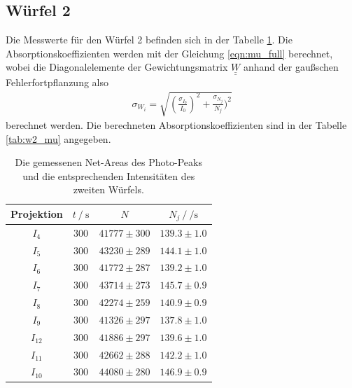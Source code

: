 \subsection{Würfel 2}
Die Messwerte für den Würfel 2 befinden sich in der Tabelle \ref{tab:w2}. Die Absorptionskoeffizienten werden mit der Gleichung \ref{eqn:mu_full} berechnet, wobei die Diagonalelemente der Gewichtungsmatrix $\underline{\underline{W}}$ 
anhand der gaußschen Fehlerfortpflanzung also 
\begin{align}
  \sigma_{W_i} = \sqrt{(\frac{\sigma_{I_0}}{I_0})^2 + \frac{\sigma_{N_j}}{N_j})^2}
\end{align}
berechnet werden. Die berechneten Absorptionskoeffizienten sind in der Tabelle \ref{tab:w2_mu} angegeben. 
\begin{table}[H]
  \centering
  \begin{tabular}{c c c c}
    \toprule
     Projektion &  $t \:/\: \si{\second}$ &     $N$ &           $N_j \:/\: \si{\per\second}$ \\
    \midrule
            $I_{  4}$ &   $300$ & $41777 \pm    300$ & $139.3\pm1.0$ \\
            $I_{  5}$ &   $300$ & $43230 \pm    289$ & $144.1\pm1.0$ \\
            $I_{  6}$ &   $300$ & $41772 \pm    287$ & $139.2\pm1.0$ \\
            $I_{  7}$ &   $300$ & $43714 \pm    273$ & $145.7\pm0.9$ \\
            $I_{  8}$ &   $300$ & $42274 \pm    259$ & $140.9\pm0.9$ \\
            $I_{  9}$ &   $300$ & $41326 \pm    297$ & $137.8\pm1.0$ \\
            $I_{ 12}$ &   $300$ & $41886 \pm    297$ & $139.6\pm1.0$ \\
            $I_{ 11}$ &   $300$ & $42662 \pm    288$ & $142.2\pm1.0$ \\
            $I_{ 10}$ &   $300$ & $44080 \pm    280$ & $146.9\pm0.9$ \\
    \bottomrule
    \end{tabular}
  \caption{Die gemessenen Net-Areas des Photo-Peaks und die entsprechenden Intensitäten des zweiten Würfels. }
  \label{tab:w2}
\end{table}

